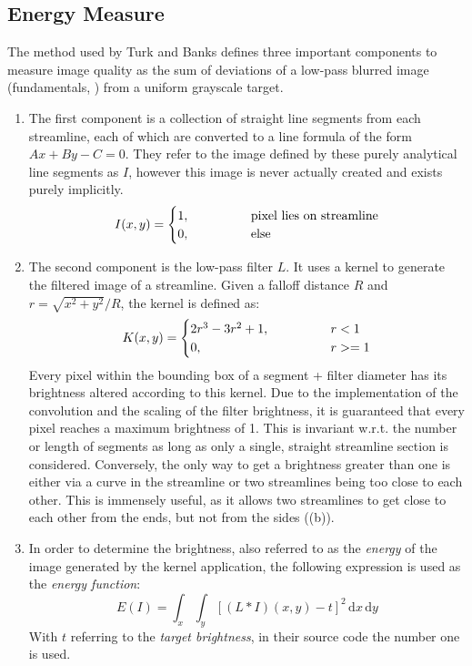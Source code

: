 \subsection{Energy Measure}
The method used by Turk and Banks defines three important components to measure image quality as the
sum of deviations of a low-pass blurred image (fundamentals, ) from a uniform grayscale target.
\begin{enumerate}
    \item The first component is a collection of straight line segments from each streamline,
    each of which are converted to a line formula of the form $Ax + By - C = 0$.
    They refer to the image defined by these purely analytical line segments as $I$,
    however this image is never actually created and exists purely implicitly.
    \begin{equation*}
        I(x,y) = \begin{cases}
            1, \kern4em & \text{pixel lies on streamline}\\
            0,          & \text{else}
    \end{cases}
    \end{equation*}
    
    \item The second component is the low-pass filter $L$.
    It uses a kernel to generate the filtered image of a streamline.
    Given a falloff distance $R$ and $r=\sqrt{x^2+y^2} / R$, the kernel is defined as:
    \begin{equation*}
        K(x,y) = \begin{cases}
            2r^3 - 3r^2 + 1, \kern4em & r < 1\\
            0,               & r >= 1
        \end{cases}
    \end{equation*}
    Every pixel within the bounding box of a segment + filter diameter has its brightness altered according to this kernel.
    Due to the implementation of the convolution and the scaling of the filter brightness, it is guaranteed that every pixel reaches a maximum brightness of 1.
    This is invariant w.r.t. the number or length of segments as long as only a single,
    straight streamline section is considered.
    Conversely, the only way to get a brightness greater than one is either via a curve in the streamline or
    two streamlines being too close to each other.
    This is immensely useful, as it allows two streamlines to get close to each other from the ends, 
    but not from the sides ((b)).
    
    \item In order to determine the brightness, also referred to as the \textit{energy}
    of the image generated by the kernel application,
    the following expression is used as the \textit{energy function}:
    \begin{equation}
        E(I) = \int_x\int_y\left[(L\ast I)(x,y)-t\right]^2\,\text{d}x\,\text{d}y
    \end{equation}
    With $t$ referring to the \textit{target brightness}, in their source code the number one is used.
\end{enumerate}
